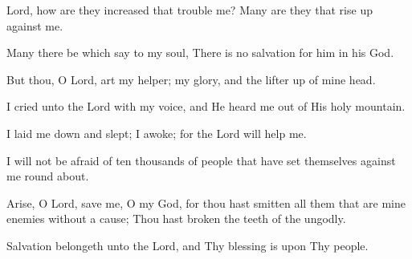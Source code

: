 Lord, how are they increased that trouble me? Many are they that rise up against me.

Many there be which say to my soul, There is no salvation for him in his God.

But thou, O Lord, art my helper; my glory, and the lifter up of mine head.

I cried unto the Lord with my voice, and He heard me out of His holy mountain.

I laid me down and slept; I awoke; for the Lord will help me.

I will not be afraid of ten thousands of people that have set themselves against me round about.

Arise, O Lord, save me, O my God, for thou hast smitten all them that are mine enemies without a cause; Thou hast broken the teeth of the ungodly.

Salvation belongeth unto the Lord, and Thy blessing is upon Thy people.
